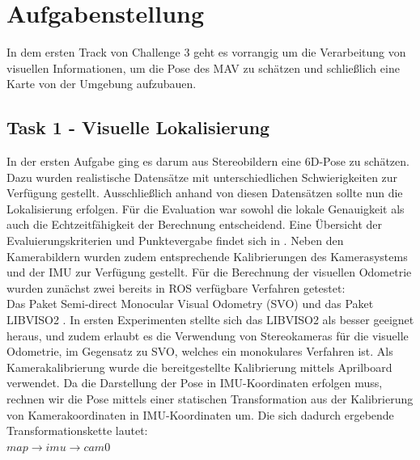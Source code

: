 \documentclass[12pt,titlepage, a4paper]{article}
\begin{document}
\section{Aufgabenstellung} 
In dem ersten Track von Challenge 3 geht es vorrangig um die Verarbeitung von visuellen Informationen, um die Pose des MAV zu schätzen und schließlich eine Karte von der Umgebung aufzubauen.



\subsection{Task 1 - Visuelle Lokalisierung}
In der ersten Aufgabe ging es darum aus Stereobildern eine 6D-Pose zu schätzen. Dazu wurden realistische Datensätze mit unterschiedlichen Schwierigkeiten zur Verfügung gestellt.
Ausschließlich anhand von diesen Datensätzen sollte nun die Lokalisierung erfolgen. Für die Evaluation war sowohl die lokale Genauigkeit als auch die Echtzeitfähigkeit der Berechnung entscheidend.
Eine \"Ubersicht der Evaluierungskriterien und Punktevergabe findet sich in \cite{eurocannex}.
Neben den Kamerabildern wurden zudem entsprechende Kalibrierungen des Kamerasystems und der IMU zur Verfügung gestellt. 
Für die Berechnung der visuellen Odometrie wurden zunächst zwei bereits in ROS verfügbare Verfahren getestet:\\
Das Paket Semi-direct Monocular Visual Odometry (SVO)\cite{EPFL-CONF-199740} und das Paket LIBVISO2 \cite{Geiger11}.
In ersten Experimenten stellte sich das LIBVISO2 als besser geeignet heraus, und zudem erlaubt es die Verwendung von Stereokameras für die visuelle Odometrie, 
im Gegensatz zu SVO, welches ein monokulares Verfahren ist.
Als Kamerakalibrierung wurde die bereitgestellte Kalibrierung mittels Aprilboard verwendet.
Da die Darstellung der Pose in IMU-Koordinaten erfolgen muss, rechnen wir die Pose mittels einer statischen Transformation aus der Kalibrierung von Kamerakoordinaten in IMU-Koordinaten um.
Die sich dadurch ergebende Transformationskette lautet:\\

$  map \rightarrow imu \rightarrow cam0 $\\
\end{document}

